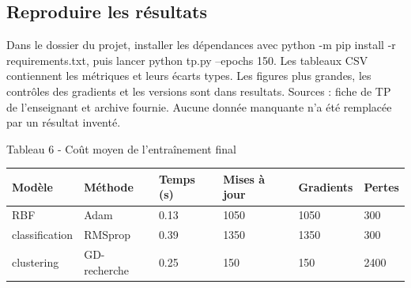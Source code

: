 \documentclass[10pt,a4paper]{article}
\begin{document}
\subsection*{Reproduire les résultats}
Dans le dossier du projet, installer les dépendances avec python -m pip install -r requirements.txt, puis lancer python tp.py --epochs 150. Les tableaux CSV contiennent les métriques et leurs écarts types. Les figures plus grandes, les contrôles des gradients et les versions sont dans resultats. Sources : fiche de TP de l’enseignant et archive fournie. Aucune donnée manquante n’a été remplacée par un résultat inventé.

\begin{center}{\footnotesize Tableau 6 - Coût moyen de l’entraînement final\par\medskip\begin{tabular}{llllll}\toprule
Modèle & Méthode & Temps (s) & Mises à jour & Gradients & Pertes \\
\midrule
RBF & Adam & 0.13 & 1050 & 1050 & 300 \\
classification & RMSprop & 0.39 & 1350 & 1350 & 300 \\
clustering & GD-recherche & 0.25 & 150 & 150 & 2400 \\
\bottomrule\end{tabular}}\end{center}
\end{document}
